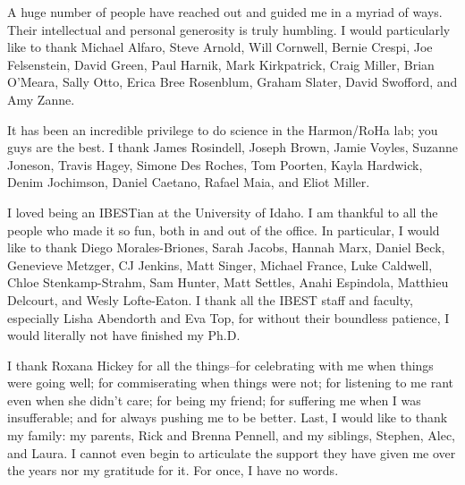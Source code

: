 A huge number of people have reached out and guided me in a myriad of ways. Their intellectual and personal generosity is truly humbling. I would particularly like to thank Michael Alfaro, Steve Arnold, Will Cornwell, Bernie Crespi, Joe Felsenstein, David Green, Paul Harnik, Mark Kirkpatrick, Craig Miller, Brian O'Meara, Sally Otto, Erica Bree Rosenblum, Graham Slater, David Swofford, and Amy Zanne.

It has been an incredible privilege to do science in the Harmon/RoHa lab; you guys are the best. I thank James Rosindell, Joseph Brown, Jamie Voyles, Suzanne Joneson, Travis Hagey, Simone Des Roches, Tom Poorten, Kayla Hardwick, Denim Jochimson,  Daniel Caetano, Rafael Maia, and Eliot Miller.

I loved being an IBESTian at the University of Idaho. I am thankful to all the people who made it so fun, both in and out of the office. In particular, I would like to thank Diego Morales-Briones, Sarah Jacobs, Hannah Marx, Daniel Beck, Genevieve Metzger, CJ Jenkins, Matt Singer, Michael France, Luke Caldwell, Chloe Stenkamp-Strahm, Sam Hunter, Matt Settles, Anahi Espindola, Matthieu Delcourt, and Wesly Lofte-Eaton. I thank all the IBEST staff and faculty, especially Lisha Abendorth and Eva Top, for without their boundless patience, I would literally not have finished my Ph.D.

I thank Roxana Hickey for all the things--for celebrating with me when things were going well; for commiserating when things were not; for listening to me rant even when she didn't care; for being my friend; for suffering me when I was insufferable; and for always pushing me to be better. Last, I would like to thank my family: my parents, Rick and Brenna Pennell, and my siblings, Stephen, Alec, and Laura. I cannot even begin to articulate the support they have given me over the years nor my gratitude for it. For once, I have no words.


